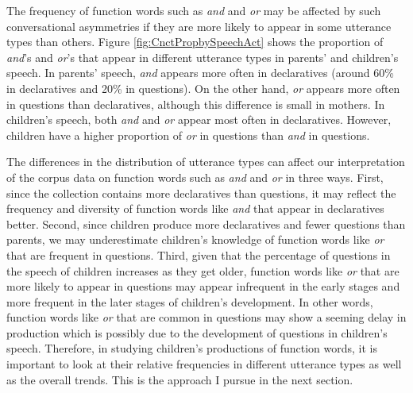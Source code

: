 \documentclass[,man,floatsintext]{apa6}
\begin{document}
The frequency of function words such as \emph{and} and \emph{or} may be affected by such conversational asymmetries if they are more likely to appear in some utterance types than others. Figure \ref{fig:CnctPropbySpeechAct} shows the proportion of \emph{and}'s and \emph{or}'s that appear in different utterance types in parents' and children's speech. In parents' speech, \emph{and} appears more often in declaratives (around 60\% in declaratives and 20\% in questions). On the other hand, \emph{or} appears more often in questions than declaratives, although this difference is small in mothers. In children's speech, both \emph{and} and \emph{or} appear most often in declaratives. However, children have a higher proportion of \emph{or} in questions than \emph{and} in questions.

The differences in the distribution of utterance types can affect our interpretation of the corpus data on function words such as \emph{and} and \emph{or} in three ways. First, since the collection contains more declaratives than questions, it may reflect the frequency and diversity of function words like \emph{and} that appear in declaratives better. Second, since children produce more declaratives and fewer questions than parents, we may underestimate children's knowledge of function words like \emph{or} that are frequent in questions. Third, given that the percentage of questions in the speech of children increases as they get older, function words like \emph{or} that are more likely to appear in questions may appear infrequent in the early stages and more frequent in the later stages of children's development. In other words, function words like \emph{or} that are common in questions may show a seeming delay in production which is possibly due to the development of questions in children's speech. Therefore, in studying children's productions of function words, it is important to look at their relative frequencies in different utterance types as well as the overall trends. This is the approach I pursue in the next section.
\end{document}
